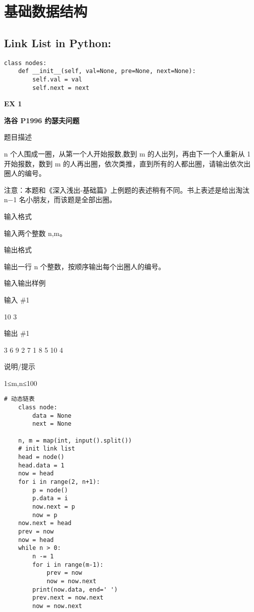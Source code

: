 \documentclass[../main]{subfiles}
\begin{document}
\section{基础数据结构}
    
\subsection{Link List in Python:}

\begin{lstlisting}[style = Python]
class nodes:
    def __init__(self, val=None, pre=None, next=None):
        self.val = val
        self.next = next
\end{lstlisting}

\textbf{EX 1} 


\textbf{洛谷 P1996 约瑟夫问题}

题目描述

n 个人围成一圈，从第一个人开始报数,数到 m 的人出列，再由下一个人重新从 1 开始报数，数到 m 的人再出圈，依次类推，直到所有的人都出圈，请输出依次出圈人的编号。

注意：本题和《深入浅出-基础篇》上例题的表述稍有不同。书上表述是给出淘汰 n−1 名小朋友，而该题是全部出圈。

输入格式

输入两个整数 n,m。

输出格式

输出一行 n 个整数，按顺序输出每个出圈人的编号。

输入输出样例

输入 \#1

10 3

输出 \#1

3 6 9 2 7 1 8 5 10 4

说明/提示

1≤m,n≤100

\begin{lstlisting}[style = Python]
    # 动态链表
    class node:
        data = None
        next = None
    
    n, m = map(int, input().split())
    # init link list
    head = node()
    head.data = 1
    now = head
    for i in range(2, n+1):
        p = node()
        p.data = i
        now.next = p
        now = p
    now.next = head
    prev = now
    now = head
    while n > 0:
        n -= 1
        for i in range(m-1):
            prev = now
            now = now.next
        print(now.data, end=' ')
        prev.next = now.next
        now = now.next
\end{lstlisting}
\end{document}
